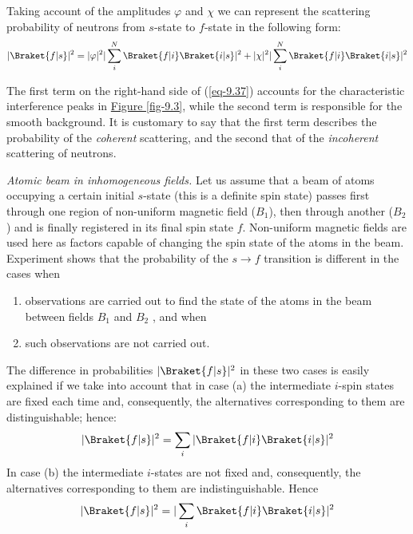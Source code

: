 \documentclass[a4paper,sfsidenotes,colorlinks=true]{tufte-book}
\numberwithin{equation}{section}
\numberwithin{figure}{section}
\begin{document}
Taking account of the amplitudes $\varphi$ and $\chi$ we can represent the scattering probability of neutrons from $s$-state to $f$-state in the following form:
\begin{equation}%
|\Braket{f|s}|^{2} = |\varphi|^{2} |\sum_{i}^{N} \Braket{f|i}
\Braket{i|s}|^{2} + | \chi |^{2} |\sum_{i}^{N} \Braket{f|i}
\Braket{i|s}|^{2}
\label{eq-9.37}
\end{equation}

The first term on the right-hand side of (\ref{eq-9.37}) accounts for the characteristic interference peaks in \hyperref[fig9.3]{Figure \ref{fig-9.3}}, while the second term is responsible for the smooth background. It is customary to say that the first term describes the probability of the \emph{coherent} scattering, and the second that of the \emph{incoherent} scattering of neutrons.

\emph{Atomic beam in inhomogeneous fields.} Let us assume that a beam
of atoms occupying a certain initial $s$-state (this is a definite
spin state) passes first through one region of non-uniform magnetic
field ($B_{1}$), then through another ($B_{2}$) and is finally
registered in its final spin state $f$. Non-uniform magnetic fields
are used here as factors capable of changing the spin state of the
atoms in the beam. Experiment shows that the probability of the $s \to
f$ transition is different in the cases when 
\begin{enumerate}[label=(\alph*)]
\item  observations are carried out to find the state of the atoms in
  the beam between fields $B_{1}$ and $B_{2}$ , and when 
\item  such observations are not carried out. 
\end{enumerate}

The difference in probabilities $| \Braket{f | s} |^{2}$ in these two cases
is easily explained if we take into account that in case (a) the
intermediate $i$-spin states are fixed each time and, consequently, the
alternatives corresponding to them are distinguishable; hence:
\begin{equation}%
|\Braket{f|s}|^{2} = \sum_{i}|\Braket{f|i}\Braket{i|s}|^{2}
\label{eq-9.38}
\end{equation}
In case (b) the intermediate $i$-states are not fixed and, consequently, the alternatives corresponding to them are indistinguishable. Hence
\begin{equation}%
|\Braket{f|s}|^{2} = | \sum_{i} \Braket{f|i}\Braket{i|s}|^{2}
\label{eq-9.39}
\end{equation}
\end{document}
